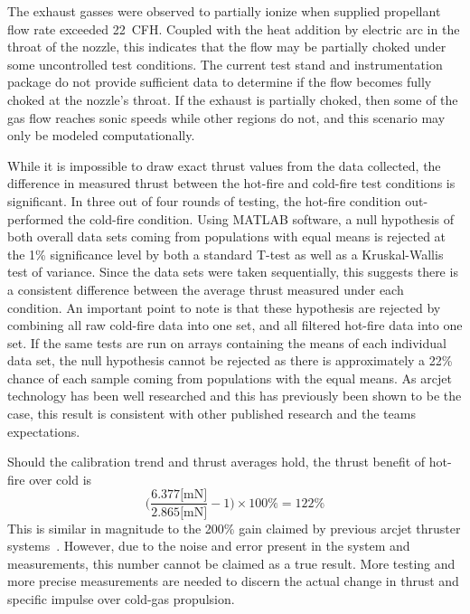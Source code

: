 \documentclass[conference]{IEEEtran}
\begin{document}
The exhaust gasses were observed to partially ionize when supplied propellant flow rate exceeded \SI{22}{CFH}.
Coupled with the heat addition by electric arc in the throat of the nozzle, this indicates that the flow may be partially choked under some uncontrolled test conditions.
The current test stand and instrumentation package do not provide sufficient data to determine if the flow becomes fully choked at the nozzle's throat.
If the exhaust is partially choked, then some of the gas flow reaches sonic speeds while other regions do not, and this scenario may only be modeled computationally.

While it is impossible to draw exact thrust values from the data collected, the difference in measured thrust between the hot-fire and cold-fire test conditions is significant.
In three out of four rounds of testing, the hot-fire condition out-performed the cold-fire condition.
Using MATLAB software, a null hypothesis of both overall data sets coming from populations with equal means is rejected at the 1\% significance level by both a standard T-test as well as a Kruskal-Wallis test of variance.
Since the data sets were taken sequentially, this suggests there is a consistent difference between the average thrust measured under each condition.
An important point to note is that these hypothesis are rejected by combining all raw cold-fire data into one set, and all filtered hot-fire data into one set.
If the same tests are run on arrays containing the means of each individual data set, the null hypothesis cannot be rejected as there is approximately a 22\% chance of each sample coming from populations with the equal means.
As arcjet technology has been well researched and this has previously been shown to be the case, this result is consistent with other published research and the teams expectations.

Should the calibration trend and thrust averages hold, the thrust benefit of hot-fire over cold is
\begin{equation}
  \Bigg(\frac{6.377 \text{[mN]}}{2.865 \text{[mN]}} - 1\Bigg)\times100\% = 122\%
  \end{equation}
This is similar in magnitude to the 200\% gain claimed by previous arcjet thruster systems~\cite{sutton2010rocket}.
However, due to the noise and error present in the system and measurements, this number cannot be claimed as a true result.
More testing and more precise measurements are needed to discern the actual change in thrust and specific impulse over cold-gas propulsion.
\end{document}

